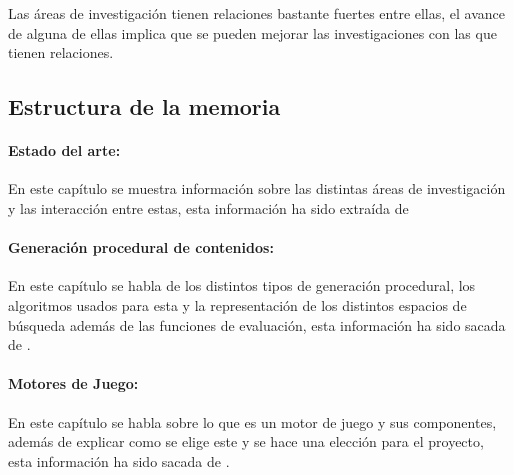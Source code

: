 Las áreas de investigación tienen relaciones bastante fuertes entre ellas, el avance de alguna de ellas implica que se pueden mejorar las investigaciones con las que tienen relaciones.


%
%
\subsection*{Estructura de la memoria}

\paragraph*{Estado del arte:}
En este capítulo se muestra información sobre las distintas áreas de investigación y las interacción entre estas, esta información ha sido extraída de \cite{B1}

\paragraph*{Generación procedural de contenidos:}
En este capítulo se habla de los distintos tipos de generación procedural, los algoritmos usados para esta y la representación de los distintos espacios de búsqueda además de las funciones de evaluación, esta información ha sido sacada de \cite{B1}\cite{B2}\cite{B3}\cite{B4}\cite{B5}\cite{B6}\cite{B7}\cite{B8}.

\paragraph*{Motores de Juego:}
En este capítulo se habla sobre lo que es un motor de juego y sus componentes, además de explicar como se elige este y se hace una elección para el proyecto, esta información ha sido sacada de \cite{B9}\cite{B10}\cite{11}.
